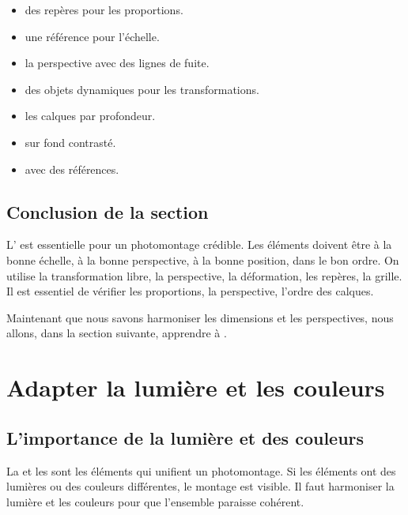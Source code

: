 \begin{itemize}
    \item {} des repères pour les proportions.
    \item {} une référence pour l'échelle.
    \item {} la perspective avec des lignes de fuite.
    \item {} des objets dynamiques pour les transformations.
    \item {} les calques par profondeur.
    \item {} sur fond contrasté.
    \item {} avec des références.
\end{itemize}

\subsection*{Conclusion de la section}

L' est essentielle pour un photomontage crédible. Les éléments doivent être à la bonne échelle, à la bonne perspective, à la bonne position, dans le bon ordre. On utilise la transformation libre, la perspective, la déformation, les repères, la grille. Il est essentiel de vérifier les proportions, la perspective, l'ordre des calques.

Maintenant que nous savons harmoniser les dimensions et les perspectives, nous allons, dans la section suivante, apprendre à .

\section{Adapter la lumière et les couleurs}

\subsection{L'importance de la lumière et des couleurs}

La  et les  sont les éléments qui unifient un photomontage. Si les éléments ont des lumières ou des couleurs différentes, le montage est visible. Il faut harmoniser la lumière et les couleurs pour que l'ensemble paraisse cohérent.

